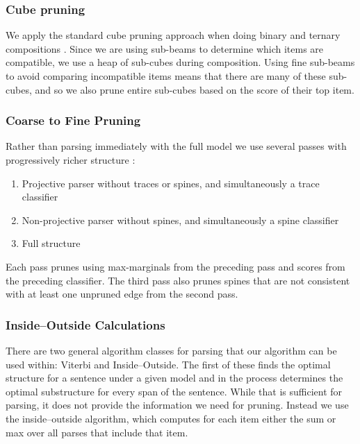 \subsubsection{Cube pruning}

We apply the standard cube pruning approach when doing binary and ternary compositions \parencite{Chiang:2007}.
Since we are using sub-beams to determine which items are compatible, we use a heap of sub-cubes during composition.
Using fine sub-beams to avoid comparing incompatible items means that there are many of these sub-cubes, and so we also prune entire sub-cubes based on the score of their top item.

\subsubsection{Coarse to Fine Pruning}

Rather than parsing immediately with the full model we use several passes with progressively richer structure \parencite{Goodman:1997}:

\begin{enumerate}
  \item Projective parser without traces or spines, and simultaneously a trace classifier
  \item Non-projective parser without spines, and simultaneously a spine classifier
  \item Full structure
\end{enumerate}

Each pass prunes using max-marginals from the preceding pass and scores from the preceding classifier.
The third pass also prunes spines that are not consistent with at least one unpruned edge from the second pass.

\subsubsection{Inside--Outside Calculations}

There are two general algorithm classes for parsing that our algorithm can be used within: Viterbi and Inside--Outside.
The first of these finds the optimal structure for a sentence under a given model and in the process determines the optimal substructure for every span of the sentence.
While that is sufficient for parsing, it does not provide the information we need for pruning.
Instead we use the inside--outside algorithm, which computes for each item either the sum or max over all parses that include that item.

